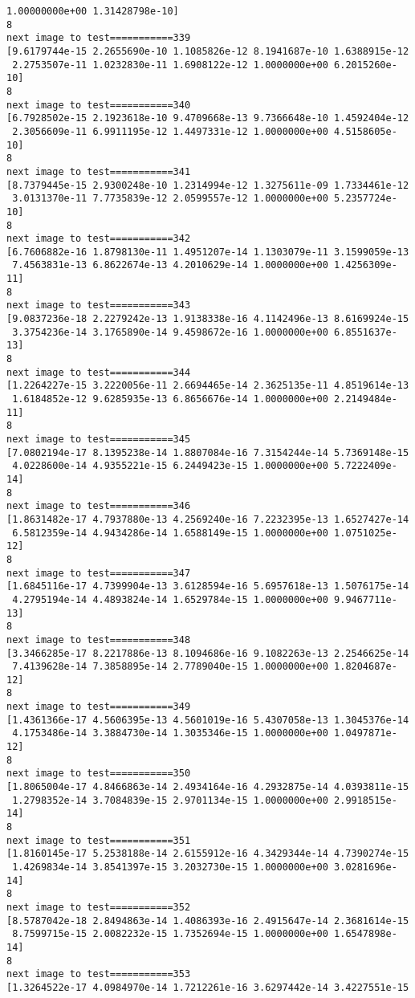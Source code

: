 \documentclass[11pt]{article}
\begin{document}
\begin{Verbatim}[commandchars=\\\{\}]
 1.00000000e+00 1.31428798e-10]
8
next image to test===========339
[9.6179744e-15 2.2655690e-10 1.1085826e-12 8.1941687e-10 1.6388915e-12
 2.2753507e-11 1.0232830e-11 1.6908122e-12 1.0000000e+00 6.2015260e-10]
8
next image to test===========340
[6.7928502e-15 2.1923618e-10 9.4709668e-13 9.7366648e-10 1.4592404e-12
 2.3056609e-11 6.9911195e-12 1.4497331e-12 1.0000000e+00 4.5158605e-10]
8
next image to test===========341
[8.7379445e-15 2.9300248e-10 1.2314994e-12 1.3275611e-09 1.7334461e-12
 3.0131370e-11 7.7735839e-12 2.0599557e-12 1.0000000e+00 5.2357724e-10]
8
next image to test===========342
[6.7606882e-16 1.8798130e-11 1.4951207e-14 1.1303079e-11 3.1599059e-13
 7.4563831e-13 6.8622674e-13 4.2010629e-14 1.0000000e+00 1.4256309e-11]
8
next image to test===========343
[9.0837236e-18 2.2279242e-13 1.9138338e-16 4.1142496e-13 8.6169924e-15
 3.3754236e-14 3.1765890e-14 9.4598672e-16 1.0000000e+00 6.8551637e-13]
8
next image to test===========344
[1.2264227e-15 3.2220056e-11 2.6694465e-14 2.3625135e-11 4.8519614e-13
 1.6184852e-12 9.6285935e-13 6.8656676e-14 1.0000000e+00 2.2149484e-11]
8
next image to test===========345
[7.0802194e-17 8.1395238e-14 1.8807084e-16 7.3154244e-14 5.7369148e-15
 4.0228600e-14 4.9355221e-15 6.2449423e-15 1.0000000e+00 5.7222409e-14]
8
next image to test===========346
[1.8631482e-17 4.7937880e-13 4.2569240e-16 7.2232395e-13 1.6527427e-14
 6.5812359e-14 4.9434286e-14 1.6588149e-15 1.0000000e+00 1.0751025e-12]
8
next image to test===========347
[1.6845116e-17 4.7399904e-13 3.6128594e-16 5.6957618e-13 1.5076175e-14
 4.2795194e-14 4.4893824e-14 1.6529784e-15 1.0000000e+00 9.9467711e-13]
8
next image to test===========348
[3.3466285e-17 8.2217886e-13 8.1094686e-16 9.1082263e-13 2.2546625e-14
 7.4139628e-14 7.3858895e-14 2.7789040e-15 1.0000000e+00 1.8204687e-12]
8
next image to test===========349
[1.4361366e-17 4.5606395e-13 4.5601019e-16 5.4307058e-13 1.3045376e-14
 4.1753486e-14 3.3884730e-14 1.3035346e-15 1.0000000e+00 1.0497871e-12]
8
next image to test===========350
[1.8065004e-17 4.8466863e-14 2.4934164e-16 4.2932875e-14 4.0393811e-15
 1.2798352e-14 3.7084839e-15 2.9701134e-15 1.0000000e+00 2.9918515e-14]
8
next image to test===========351
[1.8160145e-17 5.2538188e-14 2.6155912e-16 4.3429344e-14 4.7390274e-15
 1.4269834e-14 3.8541397e-15 3.2032730e-15 1.0000000e+00 3.0281696e-14]
8
next image to test===========352
[8.5787042e-18 2.8494863e-14 1.4086393e-16 2.4915647e-14 2.3681614e-15
 8.7599715e-15 2.0082232e-15 1.7352694e-15 1.0000000e+00 1.6547898e-14]
8
next image to test===========353
[1.3264522e-17 4.0984970e-14 1.7212261e-16 3.6297442e-14 3.4227551e-15

\end{Verbatim}
\end{document}
